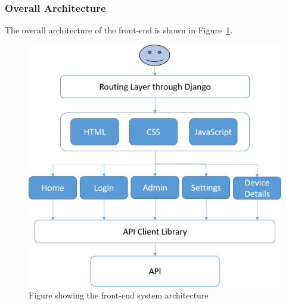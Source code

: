 \documentclass[10pt,twocolumn]{witseiepaper}
\begin{document}
	\subsubsection{Overall Architecture}
	The overall architecture of the front-end is shown in Figure~\ref{system_architecture}.
	\begin{figure}[H]
		\centering
		\label{system_architecture}
		\includegraphics[width=0.9\linewidth]{System_Architecture}
		\caption{Figure showing the front-end system architecture}
	\end{figure}
	
\end{document}

